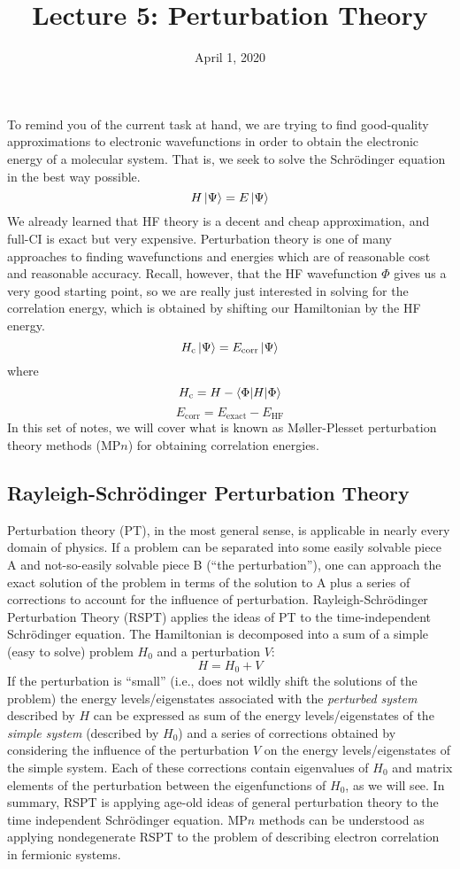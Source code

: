 \documentclass{article}
\title{Lecture 5: Perturbation Theory}
\date{April 1, 2020}
\newcommand{\Ecorr}{E_{\mathrm{corr}}}
\newcommand{\Hc}{H_{\mathrm{c}}}
\begin{document}
\maketitle
\noindent
To remind you of the current task at hand, we are trying to find good-quality approximations 
    to electronic wavefunctions in order to obtain the electronic energy of a molecular system. 
That is, we seek to solve the Schr{\"o}dinger equation in the best way possible.
\[H \ket{\Psi} = E \ket{\Psi} \]
We already learned that HF theory is a decent and cheap approximation, and full-CI is exact but very expensive. 
Perturbation theory is one of many approaches to finding wavefunctions and energies which are of 
    reasonable cost and reasonable accuracy.
Recall, however, that the HF wavefunction $\Phi$ gives us a very good starting point, so we are really just interested in solving for the correlation energy,
which is obtained by shifting our Hamiltonian by the HF energy.
\[\Hc \ket{\Psi} = \Ecorr \ket{\Psi} \]
where 
\[\Hc = H - \braket{\Phi| H | \Phi} \]
\[\Ecorr = E_{\mathrm{exact}} - E_{\mathrm{HF}}\]
In this set of notes, we will cover what is known as M{\o}ller-Plesset perturbation theory methods (MP$n$) 
    for obtaining correlation energies.

\subsection{Rayleigh-Schr{\"o}dinger Perturbation Theory}
Perturbation theory (PT), in the most general sense, is applicable in nearly every domain of physics. 
If a problem can be separated into some easily solvable piece A and not-so-easily solvable piece B 
    (``the perturbation''), one can approach the exact solution of the problem in terms of the solution to A 
    plus a series of corrections to account for the influence of perturbation.
Rayleigh-Schr{\"o}dinger Perturbation Theory (RSPT) applies the ideas of PT to the time-independent 
    Schr{\"o}dinger equation.
The Hamiltonian is decomposed into a sum of a simple (easy to solve) problem $H_0$ and a perturbation $V$:
\[H = H_0 + V \]
If the perturbation is ``small'' (i.e., does not wildly shift the solutions of the problem) the 
    energy levels/eigenstates associated with the \textit{perturbed system} described by $H$ can be expressed 
    as sum of the energy levels/eigenstates of  the \textit{simple system} (described by $H_0$) and a series 
    of corrections obtained by considering the influence of the perturbation $V$ on the 
    energy levels/eigenstates of the simple system.
Each of these corrections contain eigenvalues of $H_0$ and matrix elements of the perturbation 
    between the eigenfunctions of $H_0$, as we will see.
In summary, RSPT is applying age-old ideas of general perturbation theory to the
    time independent Schr{\"o}dinger equation.
MP$n$ methods can be understood as applying nondegenerate RSPT to the problem
    of describing electron correlation in fermionic systems. 
\end{document}
